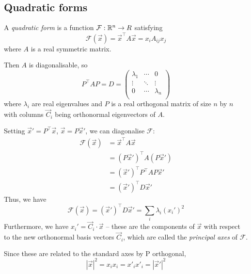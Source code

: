 \documentclass{../../template/note}
\begin{document}
    \subsection{Quadratic forms}

    \begin{definition}
        A \emph{quadratic form} is a function \(\mathcal F: \mathbb R^n \to R\) satisfying
        \[
            \mathcal F(\vec x) = \vec x^\intercal A \vec x = x_i A_{ij} x_j
        \]
        where \(A\) is a real symmetric matrix.
    \end{definition}
    Then \(A\) is diagonalisable, so
    \[
        P^\intercal AP = D = \begin{pmatrix}
            \lambda_1 & \cdots & 0 \\
            \vdots & \ddots & \vdots \\
            0 & \cdots & \lambda_n \\
        \end{pmatrix}
    \]
    where \(\lambda_i\) are real eigenvalues and \(P\) is a real orthogonal matrix of size \(n\) by \(n\) with columns \(\vec C_i\) being orthonormal eigenvectors of \(A\).

    Setting \(\vec x' = P^\intercal \vec x\), \(\vec x = P \vec x'\), we can diagonalise \(\mathcal F\):
    \begin{align*}
        \mathcal F(\vec x) &= \vec x^\intercal A \vec x \\
        &= (P \vec x')^\intercal A (P \vec x') \\
        &= (\vec x')^\intercal P^\intercal A P \vec x' \\
        &= (\vec x')^\intercal D \vec x'
    \end{align*}
    Thus, we have
    \[
        \mathcal F(\vec x) = (\vec x')^\intercal D \vec x' = \sum_{i} \lambda_i (x_i')^2
    \]
    Furthermore, we have \(x_i' = \vec C_i \cdot \vec x\) -- these are the components of \(\vec x\) with respect to the new orthonormal basis vectors \(\vec C_i\), which are called the \emph{principal axes} of \(\mathcal F\).

    Since these are related to the standard axes by P orthogonal,
    \[
        |\vec x|^2 = x_ix_i = x'_i x'_i = |\vec x'|^2
    \]
    
\end{document}

